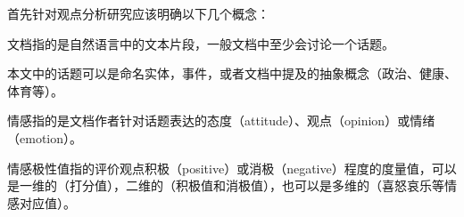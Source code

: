 首先针对观点分析研究应该明确以下几个概念：
\begin{definition}[文档（Document）]
文档指的是自然语言中的文本片段，一般文档中至少会讨论一个话题。
\end{definition}
\begin{definition}[话题（Topic）]
本文中的话题可以是命名实体，事件，或者文档中提及的抽象概念（政治、健康、体育等）。
\end{definition}
\begin{definition}[情感（Sentiment）]
情感指的是文档作者针对话题表达的态度（attitude）、观点（opinion）或情绪（emotion）。
\end{definition}
\begin{definition}
情感极性值指的评价观点积极（positive）或消极（negative）程度的度量值，可以是一维的（打分值），二维的（积极值和消极值），也可以是多维的（喜怒哀乐等情感对应值）。
\end{definition}

